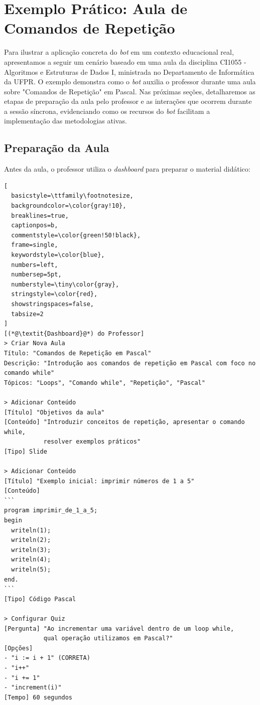\section{Exemplo Prático: Aula de Comandos de Repetição}
\label{sec:exemplo}

Para ilustrar a aplicação concreta do \textit{bot} em um contexto educacional
real, apresentamos a seguir um cenário baseado em uma aula da disciplina CI1055
- Algoritmos e Estruturas de Dados I, ministrada no Departamento de Informática
da UFPR. O exemplo demonstra como o \textit{bot} auxilia o professor durante uma
aula sobre "Comandos de Repetição" em Pascal. Nas próximas seções, detalharemos
as etapas de preparação da aula pelo professor e as interações que ocorrem
durante a sessão síncrona, evidenciando como os recursos do \textit{bot}
facilitam a implementação das metodologias ativas.

\subsection{Preparação da Aula}
\label{subsec:preparacao}

Antes da aula, o professor utiliza o \textit{dashboard} para preparar o material
didático:

\begin{lstlisting}[
  basicstyle=\ttfamily\footnotesize,
  backgroundcolor=\color{gray!10},
  breaklines=true,
  captionpos=b,
  commentstyle=\color{green!50!black},
  frame=single,
  keywordstyle=\color{blue},
  numbers=left,
  numbersep=5pt,
  numberstyle=\tiny\color{gray},
  stringstyle=\color{red},
  showstringspaces=false,
  tabsize=2
]
[(*@\textit{Dashboard}@*) do Professor]
> Criar Nova Aula
Título: "Comandos de Repetição em Pascal"
Descrição: "Introdução aos comandos de repetição em Pascal com foco no comando while"
Tópicos: "Loops", "Comando while", "Repetição", "Pascal"

> Adicionar Conteúdo
[Título] "Objetivos da aula"
[Conteúdo] "Introduzir conceitos de repetição, apresentar o comando while, 
           resolver exemplos práticos"
[Tipo] Slide

> Adicionar Conteúdo
[Título] "Exemplo inicial: imprimir números de 1 a 5"
[Conteúdo] 
```
program imprimir_de_1_a_5;
begin
  writeln(1);
  writeln(2);
  writeln(3);
  writeln(4);
  writeln(5);
end.
```
[Tipo] Código Pascal

> Configurar Quiz
[Pergunta] "Ao incrementar uma variável dentro de um loop while, 
           qual operação utilizamos em Pascal?"
[Opções] 
- "i := i + 1" (CORRETA)
- "i++"
- "i += 1"
- "increment(i)"
[Tempo] 60 segundos
\end{lstlisting}

